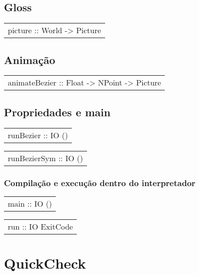 \subsection{Gloss}
\begin{haddockdesc}
\item[\begin{tabular}{@{}l}
picture :: World -> Picture
\end{tabular}]
\end{haddockdesc}
\subsection{Animação}
\begin{haddockdesc}
\item[\begin{tabular}{@{}l}
animateBezier :: Float -> {\char 91}NPoint{\char 93} -> Picture
\end{tabular}]
\end{haddockdesc}
\subsection{Propriedades e main}
\begin{haddockdesc}
\item[\begin{tabular}{@{}l}
runBezier :: IO ()
\end{tabular}]
\item[\begin{tabular}{@{}l}
runBezierSym :: IO ()
\end{tabular}]
\end{haddockdesc}
\subsubsection{Compilação e execução dentro do interpretador}
\begin{haddockdesc}
\item[\begin{tabular}{@{}l}
main :: IO ()
\end{tabular}]
\item[\begin{tabular}{@{}l}
run :: IO ExitCode
\end{tabular}]
\end{haddockdesc}
\section{QuickCheck}
